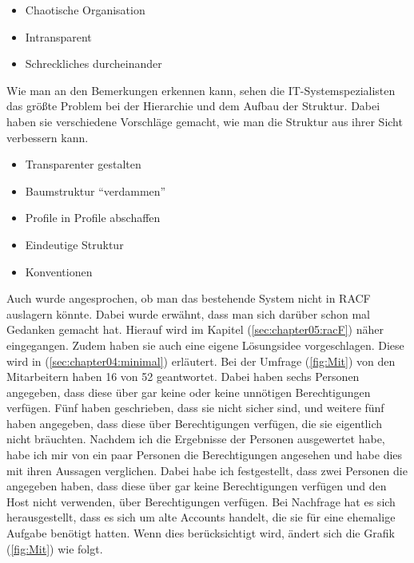 \begin{itemize}
	\item Chaotische Organisation
	\item Intransparent
	\item Schreckliches durcheinander
\end{itemize}

Wie man an den Bemerkungen erkennen kann, sehen die IT-Systemspezialisten das größte Problem bei der Hierarchie und dem Aufbau der Struktur.
Dabei haben sie verschiedene Vorschläge gemacht, wie man die Struktur aus ihrer Sicht verbessern kann.

\begin{itemize}
	\item Transparenter gestalten
	\item Baumstruktur "`verdammen"'
	\item Profile in Profile abschaffen
	\item Eindeutige Struktur
	\item Konventionen
\end{itemize}
Auch wurde angesprochen, ob man das bestehende System nicht in RACF auslagern könnte.
Dabei wurde erwähnt, dass man sich darüber schon mal Gedanken gemacht hat.
Hierauf wird im Kapitel (\ref{sec:chapter05:racF}) näher eingegangen.
Zudem haben sie auch eine eigene Lösungsidee vorgeschlagen.
Diese wird in (\ref{sec:chapter04:minimal}) erläutert.
\newline
\newline
Bei der Umfrage (\ref{fig:Mit}) von den Mitarbeitern haben 16 von 52 geantwortet.
Dabei haben sechs Personen angegeben, dass diese über gar keine oder keine unnötigen Berechtigungen verfügen.
Fünf haben geschrieben, dass sie nicht sicher sind, und weitere fünf haben angegeben, dass diese über Berechtigungen verfügen, die sie eigentlich nicht bräuchten.
Nachdem ich die Ergebnisse der Personen ausgewertet habe, habe ich mir von ein paar Personen die Berechtigungen angesehen und habe dies mit ihren Aussagen verglichen.
Dabei habe ich festgestellt, dass zwei Personen die angegeben haben, dass diese über gar keine Berechtigungen verfügen und den Host nicht verwenden, über Berechtigungen verfügen.
Bei Nachfrage hat es sich herausgestellt, dass es sich um alte Accounts handelt, die sie für eine ehemalige Aufgabe benötigt hatten.
Wenn dies berücksichtigt wird, ändert sich die Grafik (\ref{fig:Mit}) wie folgt.
